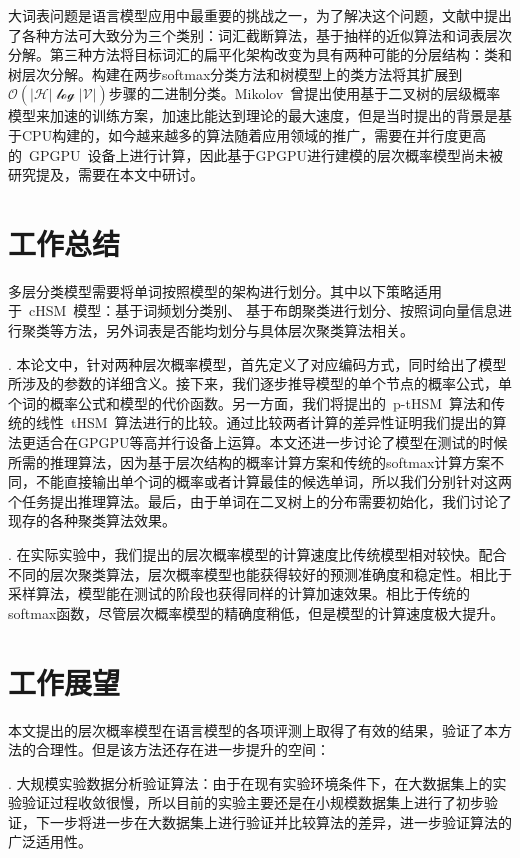 \summary
大词表问题是语言模型应用中最重要的挑战之一，为了解决这个问题，文献中提出了各种方法可大致分为三个类别：词汇截断算法，基于抽样的近似算法和词表层次分解。第三种方法将目标词汇的扁平化架构改变为具有两种可能的分层结构：类和树层次分解。构建在两步softmax分类方法和树模型上的类方法将其扩展到$\mathcal {O(| H | \log | V |)} $步骤的二进制分类。Mikolov~曾提出使用基于二叉树的层级概率模型来加速的训练方案，加速比能达到理论的最大速度，但是当时提出的背景是基于CPU构建的，如今越来越多的算法随着应用领域的推广，需要在并行度更高的~GPGPU~设备上进行计算，因此基于GPGPU进行建模的层次概率模型尚未被研究提及，需要在本文中研讨。
\section*{工作总结}
多层分类模型需要将单词按照模型的架构进行划分。其中以下策略适用于~cHSM~模型：基于词频划分类别、 基于布朗聚类进行划分、按照词向量信息进行聚类等方法，另外词表是否能均划分与具体层次聚类算法相关。


. 本论文中，针对两种层次概率模型，首先定义了对应编码方式，同时给出了模型所涉及的参数的详细含义。接下来，我们逐步推导模型的单个节点的概率公式，单个词的概率公式和模型的代价函数。另一方面，我们将提出的~p-tHSM~算法和传统的线性~tHSM~算法进行的比较。通过比较两者计算的差异性证明我们提出的算法更适合在GPGPU等高并行设备上运算。本文还进一步讨论了模型在测试的时候所需的推理算法，因为基于层次结构的概率计算方案和传统的softmax计算方案不同，不能直接输出单个词的概率或者计算最佳的候选单词，所以我们分别针对这两个任务提出推理算法。最后，由于单词在二叉树上的分布需要初始化，我们讨论了现存的各种聚类算法效果。

. 在实际实验中，我们提出的层次概率模型的计算速度比传统模型相对较快。配合不同的层次聚类算法，层次概率模型也能获得较好的预测准确度和稳定性。相比于采样算法，模型能在测试的阶段也获得同样的计算加速效果。相比于传统的softmax函数，尽管层次概率模型的精确度稍低，但是模型的计算速度极大提升。

\section*{工作展望}
本文提出的层次概率模型在语言模型的各项评测上取得了有效的结果，验证了本方法的合理性。但是该方法还存在进一步提升的空间：

. 大规模实验数据分析验证算法：由于在现有实验环境条件下，在大数据集上的实验验证过程收敛很慢，所以目前的实验主要还是在小规模数据集上进行了初步验证，下一步将进一步在大数据集上进行验证并比较算法的差异，进一步验证算法的广泛适用性。

